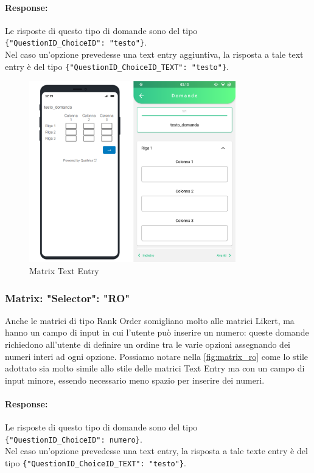 \paragraph{Response:}
Le risposte di questo tipo di domande sono del tipo\\ \texttt{\{"QuestionID\_ChoiceID": "testo"\}}.\\Nel caso un'opzione prevedesse una text entry aggiuntiva, la risposta a tale text entry è del tipo \texttt{\{"QuestionID\_ChoiceID\_TEXT": "testo"\}}.

\begin{figure}[h!]
\centering
\includegraphics[width=0.8\textwidth]{img/matrix_te}
\caption{Matrix Text Entry}
\label{fig:matrix_te}
\end{figure}

\clearpage
\subsubsection{Matrix: "Selector": "RO"}
Anche le matrici di tipo Rank Order somigliano molto alle matrici Likert, ma hanno un campo di input in cui l'utente può inserire un numero: queste domande richiedono all'utente di definire un ordine tra le varie opzioni assegnando dei numeri interi ad ogni opzione. Possiamo notare nella \autoref{fig:matrix_ro} come lo stile adottato sia molto simile allo stile delle matrici Text Entry ma con un campo di input minore, essendo necessario meno spazio per inserire dei numeri.

\paragraph{Response:}
Le risposte di questo tipo di domande sono del tipo\\ \texttt{\{"QuestionID\_ChoiceID": numero\}}.\\Nel caso un'opzione prevedesse una text entry, la risposta a tale texte entry è del tipo \texttt{\{"QuestionID\_ChoiceID\_TEXT": "testo"\}}.

